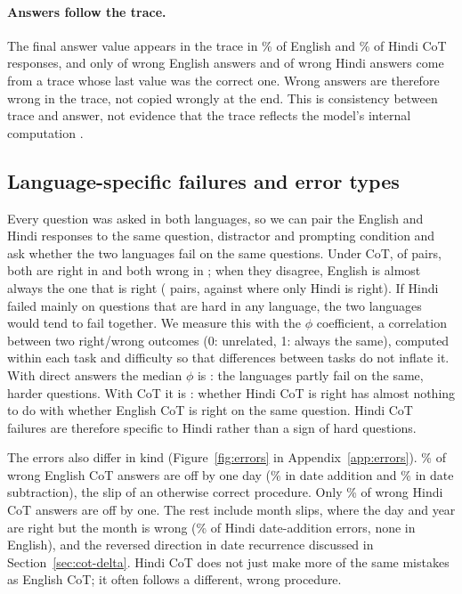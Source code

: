 \paragraph{Answers follow the trace.}
The final answer value appears in the trace in \EnAnswerInTrace{}\% of English and \HiAnswerInTrace{}\% of Hindi CoT responses, and only \EnWrongEndsGold{} of \EnWrong{} wrong English answers and \HiWrongEndsGold{} of \HiWrong{} wrong Hindi answers come from a trace whose last value was the correct one. Wrong answers are therefore wrong in the trace, not copied wrongly at the end. This is consistency between trace and answer, not evidence that the trace reflects the model's internal computation \citep{turpin-etal-2023-unfaithful}.

\subsection{Language-specific failures and error types}
\label{sec:errors}

Every question was asked in both languages, so we can pair the English and Hindi responses to the same question, distractor and prompting condition and ask whether the two languages fail on the same questions. Under CoT, of \AgreeCotPairs{} pairs, both are right in \AgreeCotBothRight{} and both wrong in \AgreeCotBothWrong{}; when they disagree, English is almost always the one that is right (\AgreeCotEnOnly{} pairs, against \AgreeCotHiOnly{} where only Hindi is right). If Hindi failed mainly on questions that are hard in any language, the two languages would tend to fail together. We measure this with the $\phi$ coefficient, a correlation between two right/wrong outcomes (0: unrelated, 1: always the same), computed within each task and difficulty so that differences between tasks do not inflate it. With direct answers the median $\phi$ is \AgreeDirectPhi{}: the languages partly fail on the same, harder questions. With CoT it is \AgreeCotPhi{}: whether Hindi CoT is right has almost nothing to do with whether English CoT is right on the same question. Hindi CoT failures are therefore specific to Hindi rather than a sign of hard questions.

The errors also differ in kind (Figure~\ref{fig:errors} in Appendix~\ref{app:errors}). \EnErrAllOffByOne{}\% of wrong English CoT answers are off by one day (\EnErrAddOffByOne{}\% in date addition and \EnErrSubOffByOne{}\% in date subtraction), the slip of an otherwise correct procedure. Only \HiErrAllOffByOne{}\% of wrong Hindi CoT answers are off by one. The rest include month slips, where the day and year are right but the month is wrong (\HiErrAddMonthSlip{}\% of Hindi date-addition errors, none in English), and the reversed direction in date recurrence discussed in Section~\ref{sec:cot-delta}. Hindi CoT does not just make more of the same mistakes as English CoT; it often follows a different, wrong procedure.
